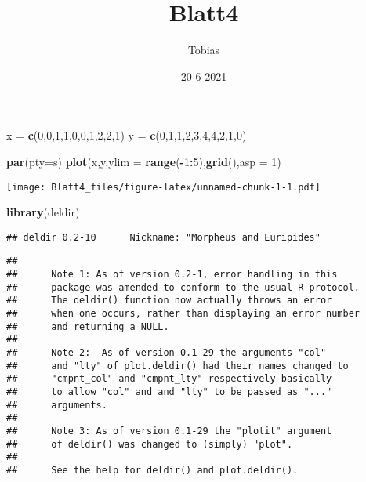 \documentclass[
]{article}
\title{Blatt4}
\author{Tobias}
\date{20 6 2021}
\newenvironment{Shaded}{\begin{snugshade}}{\end{snugshade}}
\newcommand{\DataTypeTok}[1]{\textcolor[rgb]{0.13,0.29,0.53}{#1}}
\newcommand{\DecValTok}[1]{\textcolor[rgb]{0.00,0.00,0.81}{#1}}
\newcommand{\KeywordTok}[1]{\textcolor[rgb]{0.13,0.29,0.53}{\textbf{#1}}}
\newcommand{\NormalTok}[1]{#1}
\newcommand{\OperatorTok}[1]{\textcolor[rgb]{0.81,0.36,0.00}{\textbf{#1}}}
\newcommand{\StringTok}[1]{\textcolor[rgb]{0.31,0.60,0.02}{#1}}
\begin{document}
\maketitle

\begin{Shaded}
\begin{Highlighting}[]
\NormalTok{x =}\StringTok{ }\KeywordTok{c}\NormalTok{(}\DecValTok{0}\NormalTok{,}\DecValTok{0}\NormalTok{,}\DecValTok{1}\NormalTok{,}\DecValTok{1}\NormalTok{,}\DecValTok{0}\NormalTok{,}\DecValTok{0}\NormalTok{,}\DecValTok{1}\NormalTok{,}\DecValTok{2}\NormalTok{,}\DecValTok{2}\NormalTok{,}\DecValTok{1}\NormalTok{)}
\NormalTok{y =}\StringTok{ }\KeywordTok{c}\NormalTok{(}\DecValTok{0}\NormalTok{,}\DecValTok{1}\NormalTok{,}\DecValTok{1}\NormalTok{,}\DecValTok{2}\NormalTok{,}\DecValTok{3}\NormalTok{,}\DecValTok{4}\NormalTok{,}\DecValTok{4}\NormalTok{,}\DecValTok{2}\NormalTok{,}\DecValTok{1}\NormalTok{,}\DecValTok{0}\NormalTok{)}

\KeywordTok{par}\NormalTok{(}\DataTypeTok{pty=}\StringTok{\textquotesingle{}s\textquotesingle{}}\NormalTok{)}
\KeywordTok{plot}\NormalTok{(x,y,}\DataTypeTok{ylim =} \KeywordTok{range}\NormalTok{(}\OperatorTok{{-}}\DecValTok{1}\OperatorTok{:}\DecValTok{5}\NormalTok{),}\KeywordTok{grid}\NormalTok{(),}\DataTypeTok{asp =} \DecValTok{1}\NormalTok{)}
\end{Highlighting}
\end{Shaded}

\texttt{[image: Blatt4\_files/figure-latex/unnamed-chunk-1-1.pdf]}

\begin{Shaded}
\begin{Highlighting}[]
\KeywordTok{library}\NormalTok{(deldir)}
\end{Highlighting}
\end{Shaded}

\begin{verbatim}
## deldir 0.2-10      Nickname: "Morpheus and Euripides"
\end{verbatim}

\begin{verbatim}
## 
##      Note 1: As of version 0.2-1, error handling in this 
##      package was amended to conform to the usual R protocol. 
##      The deldir() function now actually throws an error 
##      when one occurs, rather than displaying an error number 
##      and returning a NULL.
##  
##      Note 2:  As of version 0.1-29 the arguments "col" 
##      and "lty" of plot.deldir() had their names changed to 
##      "cmpnt_col" and "cmpnt_lty" respectively basically 
##      to allow "col" and and "lty" to be passed as "..." 
##      arguments.
##  
##      Note 3: As of version 0.1-29 the "plotit" argument 
##      of deldir() was changed to (simply) "plot".
##  
##      See the help for deldir() and plot.deldir().
\end{verbatim}
\end{document}
